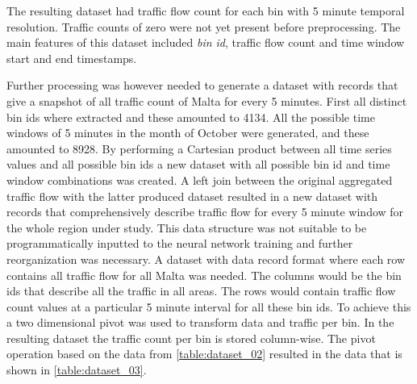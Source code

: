 \documentclass[12pt, a4paper]{report}
\theoremstyle{definition}
\theoremstyle{definition}%
\theoremstyle{definition}%
\theoremstyle{definition}%
\theoremstyle{definition}%
\theoremstyle{definition}%
\begin{document}
\begin{table}[h]	
	\centering
\caption{A sample of traffic flow count by bin for every 5 minute window.} 
\label{table:dataset_02}
\end{table}


The resulting dataset had traffic flow count for each bin with 5 minute temporal resolution. Traffic counts of zero were not yet present before preprocessing. The main features of this dataset included \textit{bin id}, traffic flow count and time window start and end timestamps. 

Further processing was however needed to generate a dataset with records that give a snapshot of all traffic count of Malta for every 5 minutes. First all distinct bin ids where extracted and these amounted to 4134. All the possible time windows of 5 minutes in the month of October were generated, and these amounted to 8928. By performing a Cartesian product between all time series values and all possible bin ids a new dataset with all possible bin id and time window combinations was created. A left join between the original aggregated traffic flow with the latter produced dataset resulted in a new dataset with records that comprehensively describe traffic flow for every 5 minute window for the whole region under study. This data structure was not suitable to be programmatically inputted to the neural network training and further reorganization was necessary. A dataset with data record format where each row contains all traffic flow for all Malta was needed. The columns would be the bin ids that describe all the traffic in all areas. The rows would contain traffic flow count values at a particular 5 minute interval for all these bin ids. To achieve this a two dimensional pivot was used to transform data and traffic per bin. In the resulting dataset the traffic count per bin is stored column-wise. The pivot operation based on the data from \ref{table:dataset_02}  resulted in the data that is shown in \ref{table:dataset_03}. 
\end{document}
